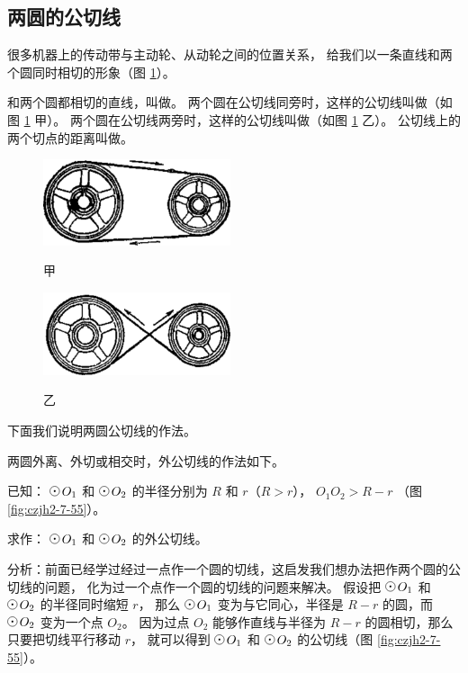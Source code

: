 \subsection{两圆的公切线}\label{subsec:czjh2-7-14}

很多机器上的传动带与主动轮、从动轮之间的位置关系，
给我们以一条直线和两个圆同时相切的形象（图 \ref{fig:czjh2-7-54}）。

和两个圆都相切的直线，叫做。
两个圆在公切线同旁时，这样的公切线叫做（如图 \ref{fig:czjh2-7-54} 甲）。
两个圆在公切线两旁时，这样的公切线叫做（如图 \ref{fig:czjh2-7-54} 乙）。
公切线上的两个切点的距离叫做。

\begin{figure}[htbp]
    \centering
    \begin{minipage}[b]{7cm}
        \centering
        \includegraphics[width=5.5cm]{../pic/czjh2-ch7-54-a.png}
        \caption*{甲}
    \end{minipage}
    \qquad
    \begin{minipage}[b]{7cm}
        \centering
        \includegraphics[width=5.5cm]{../pic/czjh2-ch7-54-b.png}
        \caption*{乙}
    \end{minipage}
    \caption{}\label{fig:czjh2-7-54}
\end{figure}



下面我们说明两圆公切线的作法。

两圆外离、外切或相交时，外公切线的作法如下。

已知： $\yuan\,O_1$ 和 $\yuan\,O_2$ 的半径分别为 $R$ 和 $r$（$R > r$），
$O_1O_2 > R - r$ （图 \ref{fig:czjh2-7-55}）。

求作： $\yuan\,O_1$ 和 $\yuan\,O_2$ 的外公切线。

分析：前面已经学过经过一点作一个圆的切线，这启发我们想办法把作两个圆的公切线的问题，
化为过一个点作一个圆的切线的问题来解决。
假设把 $\yuan\,O_1$ 和 $\yuan\,O_2$ 的半径同时缩短 $r$，
那么 $\yuan\,O_1$ 变为与它同心，半径是 $R-r$ 的圆，而 $\yuan\,O_2$ 变为一个点 $O_2$。
因为过点 $O_2$ 能够作直线与半径为 $R-r$ 的圆相切，那么只要把切线平行移动 $r$，
就可以得到 $\yuan\,O_1$ 和 $\yuan\,O_2$ 的公切线（图 \ref{fig:czjh2-7-55}）。

